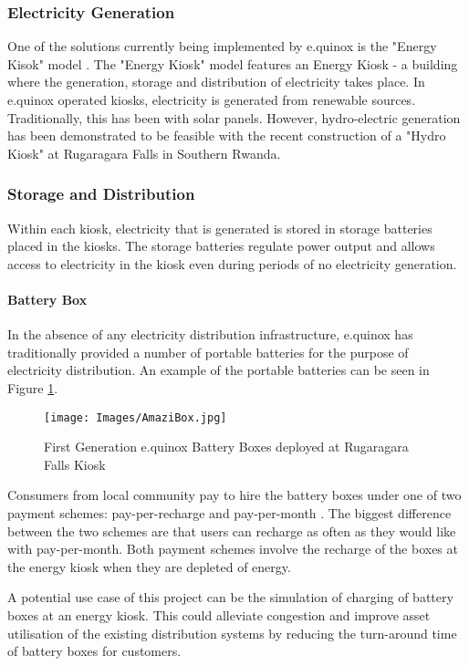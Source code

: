 \documentclass{article}
\begin{document}
\subsubsection{Electricity Generation}
One of the solutions currently being implemented by e.quinox is the "Energy Kisok" model \cite{e.quinox-EK-web:2015}. The "Energy Kiosk" model features an Energy Kiosk - a building where the generation, storage and distribution of electricity takes place.
In e.quinox operated kiosks, electricity is generated from renewable sources.
Traditionally, this has been with solar panels. However, hydro-electric generation has been demonstrated to be feasible with the recent construction of a "Hydro Kiosk" at Rugaragara Falls in Southern Rwanda.

\subsubsection{Storage and Distribution}
Within each kiosk, electricity that is generated is stored in storage batteries placed in the kiosks. The storage batteries regulate power output and allows access to electricity in the kiosk even during periods of no electricity generation.

\paragraph{Battery Box}
In the absence of any electricity distribution infrastructure, e.quinox has traditionally provided a number of portable batteries for the purpose of electricity distribution. An example of the portable batteries can be seen in Figure \ref{fig:AmaziBox}.

\begin{figure}[h!]
\centering
\texttt{[image: Images/AmaziBox.jpg]}
\caption{First Generation e.quinox Battery Boxes deployed at Rugaragara Falls Kiosk}
\label{fig:AmaziBox}
\end{figure}

Consumers from local community pay to hire the battery boxes under one of two payment schemes: pay-per-recharge and pay-per-month \cite{e.quinox-Hydro-web:2012}. The biggest difference between the two schemes are that users can recharge as often as they would like with pay-per-month. Both payment schemes involve the recharge of the boxes at the energy kiosk when they are depleted of energy.

A potential use case of this project can be the simulation of charging of battery boxes at an energy kiosk. This could alleviate congestion and improve asset utilisation of the existing distribution systems by reducing the turn-around time of battery boxes for customers.
\end{document}
